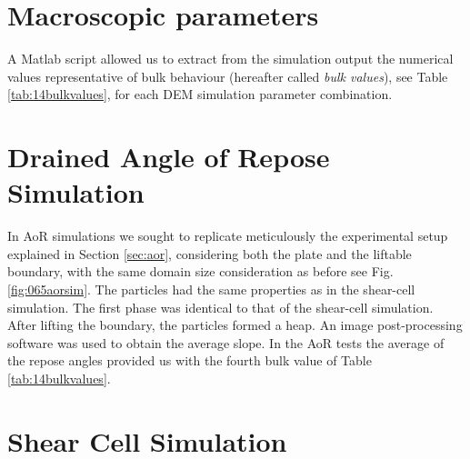 

\section{Macroscopic parameters}
\label{sec:macroscopicparameters}

A Matlab script allowed us to extract from the simulation output the numerical
values representative of bulk behaviour (hereafter called \textit{bulk values}),
see Table \ref{tab:14bulkvalues},
for each \acs{DEM} simulation parameter combination.

\section{Drained Angle of Repose Simulation}
\label{sec:aorsim}

In \acs{AoR} simulations we sought to replicate meticulously the experimental
setup explained in Section \ref{sec:aor}, considering both the plate and the
liftable boundary, with the same domain size consideration as before see Fig. \ref{fig:065aorsim}. 
The particles had the same properties as in the shear-cell simulation. 
The first phase was identical to that of the shear-cell simulation. 
After lifting the boundary, the particles formed a heap.
An image post-processing software was used to obtain the average slope.
In the \acs{AoR} tests the average of the repose angles provided us with the fourth
bulk value of Table \ref{tab:14bulkvalues}.


\section{Shear Cell Simulation}
\label{sec:scsimulation}

